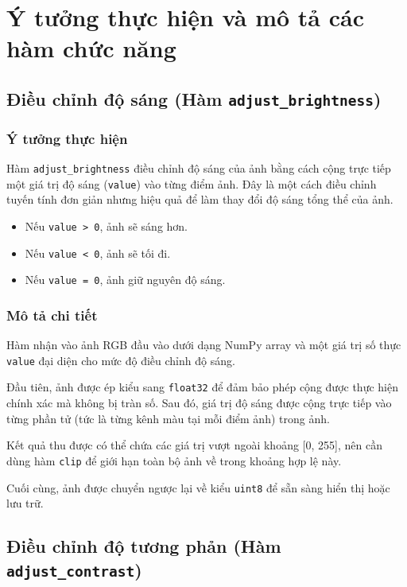 \section{Ý tưởng thực hiện và mô tả các hàm chức năng}

\subsection{Điều chỉnh độ sáng (Hàm \texttt{adjust\_brightness})}

\subsubsection*{Ý tưởng thực hiện}

Hàm \texttt{adjust\_brightness} điều chỉnh độ sáng của ảnh bằng cách cộng trực tiếp một giá trị độ sáng (\texttt{value}) vào từng điểm ảnh. Đây là một cách điều chỉnh tuyến tính đơn giản nhưng hiệu quả để làm thay đổi độ sáng tổng thể của ảnh.
\begin{itemize}
  \item Nếu \texttt{value > 0}, ảnh sẽ sáng hơn.
  \item Nếu \texttt{value < 0}, ảnh sẽ tối đi.
  \item Nếu \texttt{value = 0}, ảnh giữ nguyên độ sáng.
\end{itemize}

\subsubsection*{Mô tả chi tiết}

Hàm nhận vào ảnh RGB đầu vào dưới dạng NumPy array và một giá trị số thực \texttt{value} đại diện cho mức độ điều chỉnh độ sáng.

Đầu tiên, ảnh được ép kiểu sang \texttt{float32} để đảm bảo phép cộng được thực hiện chính xác mà không bị tràn số. Sau đó, giá trị độ sáng được cộng trực tiếp vào từng phần tử (tức là từng kênh màu tại mỗi điểm ảnh) trong ảnh.

Kết quả thu được có thể chứa các giá trị vượt ngoài khoảng [0, 255], nên cần dùng hàm \texttt{clip} để giới hạn toàn bộ ảnh về trong khoảng hợp lệ này.

Cuối cùng, ảnh được chuyển ngược lại về kiểu \texttt{uint8} để sẵn sàng hiển thị hoặc lưu trữ.

\subsection{Điều chỉnh độ tương phản (Hàm \texttt{adjust\_contrast})}

